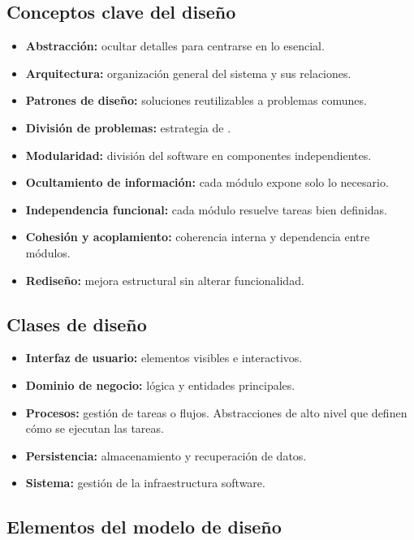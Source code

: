 \subsection{Conceptos clave del diseño}\label{subsec:conceptos-clave-del-diseno}

\begin{itemize}
    \item \textbf{Abstracción:} ocultar detalles para centrarse en lo esencial.
    \item \textbf{Arquitectura:} organización general del sistema y sus relaciones.
    \item \textbf{Patrones de diseño:} soluciones reutilizables a problemas comunes.
    \item \textbf{División de problemas:} estrategia de .
    \item \textbf{Modularidad:} división del software en componentes independientes.
    \item \textbf{Ocultamiento de información:} cada módulo expone solo lo necesario.
    \item \textbf{Independencia funcional:} cada módulo resuelve tareas bien definidas.
    \item \textbf{Cohesión y acoplamiento:} coherencia interna y dependencia entre módulos.
    \item \textbf{Rediseño:} mejora estructural sin alterar funcionalidad.
\end{itemize}

\subsection{Clases de diseño}\label{subsec:clases-de-diseno}

\begin{itemize}
    \item \textbf{Interfaz de usuario:} elementos visibles e interactivos.
    \item \textbf{Dominio de negocio:} lógica y entidades principales.
    \item \textbf{Procesos:} gestión de tareas o flujos.
    Abstracciones de alto nivel que definen cómo se ejecutan las tareas.
    \item \textbf{Persistencia:} almacenamiento y recuperación de datos.
    \item \textbf{Sistema:} gestión de la infraestructura software.
\end{itemize}

\subsection{Elementos del modelo de diseño}\label{subsec:elementos-del-modelo-de-diseno}

